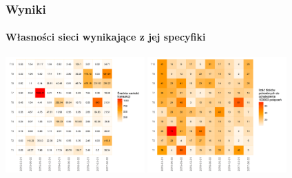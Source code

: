 \documentclass[]{beamer}
\newcommand{\sizequad}{0.40}
\begin{document}
\begin{frame}
 \frametitle{Wyniki}
 \framesubtitle{Własności sieci wynikające z jej specyfiki}
   \begin{minipage}{\textwidth}
     \centering
 		  \includegraphics[width=\sizequad\textwidth]{pictures/wartosc_transakcji/wartosc_transakcji_hm.png}\quad  
  		 \includegraphics[width=\sizequad\textwidth]{pictures/ilosc_blokow/ilosc_blokow_hm.png}  \\

\end{minipage}
\end{frame}
\end{document}
